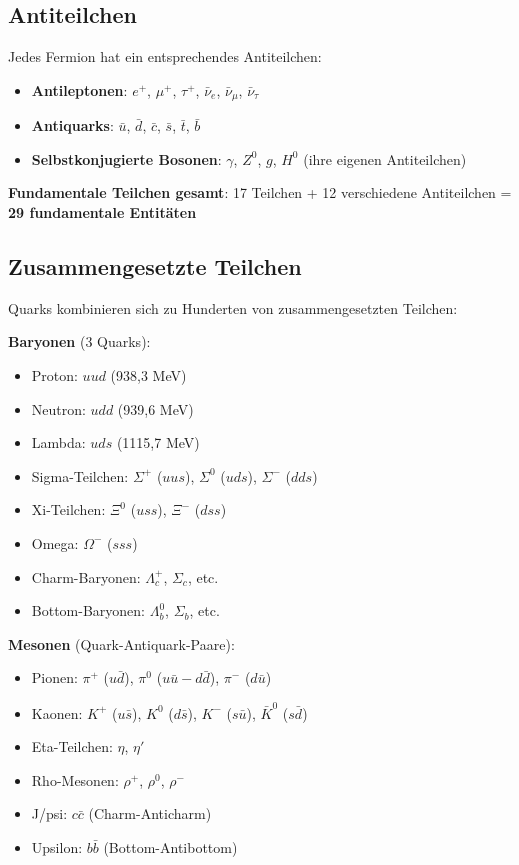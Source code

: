 \documentclass[12pt,a4paper]{article}
\begin{document}
	\subsection{Antiteilchen}
	
	Jedes Fermion hat ein entsprechendes Antiteilchen:
	
	\begin{itemize}
		\item \textbf{Antileptonen}: $e^+$, $\mu^+$, $\tau^+$, $\bar{\nu}_e$, $\bar{\nu}_\mu$, $\bar{\nu}_\tau$
		\item \textbf{Antiquarks}: $\bar{u}$, $\bar{d}$, $\bar{c}$, $\bar{s}$, $\bar{t}$, $\bar{b}$
		\item \textbf{Selbstkonjugierte Bosonen}: $\gamma$, $Z^0$, $g$, $H^0$ (ihre eigenen Antiteilchen)
	\end{itemize}
	
	\textbf{Fundamentale Teilchen gesamt}: 17 Teilchen + 12 verschiedene Antiteilchen = \textbf{29 fundamentale Entitäten}
	
	\subsection{Zusammengesetzte Teilchen}
	
	Quarks kombinieren sich zu Hunderten von zusammengesetzten Teilchen:
	
	\textbf{Baryonen} (3 Quarks):
	\begin{itemize}
		\item Proton: $uud$ (938{,}3 MeV)
		\item Neutron: $udd$ (939{,}6 MeV)
		\item Lambda: $uds$ (1115{,}7 MeV)
		\item Sigma-Teilchen: $\Sigma^+$ ($uus$), $\Sigma^0$ ($uds$), $\Sigma^-$ ($dds$)
		\item Xi-Teilchen: $\Xi^0$ ($uss$), $\Xi^-$ ($dss$)
		\item Omega: $\Omega^-$ ($sss$)
		\item Charm-Baryonen: $\Lambda_c^+$, $\Sigma_c$, etc.
		\item Bottom-Baryonen: $\Lambda_b^0$, $\Sigma_b$, etc.
	\end{itemize}
	
	\textbf{Mesonen} (Quark-Antiquark-Paare):
	\begin{itemize}
		\item Pionen: $\pi^+$ ($u\bar{d}$), $\pi^0$ ($u\bar{u} - d\bar{d}$), $\pi^-$ ($d\bar{u}$)
		\item Kaonen: $K^+$ ($u\bar{s}$), $K^0$ ($d\bar{s}$), $K^-$ ($s\bar{u}$), $\bar{K}^0$ ($s\bar{d}$)
		\item Eta-Teilchen: $\eta$, $\eta'$
		\item Rho-Mesonen: $\rho^+$, $\rho^0$, $\rho^-$
		\item J/psi: $c\bar{c}$ (Charm-Anticharm)
		\item Upsilon: $b\bar{b}$ (Bottom-Antibottom)
	\end{itemize}
	
\end{document}
